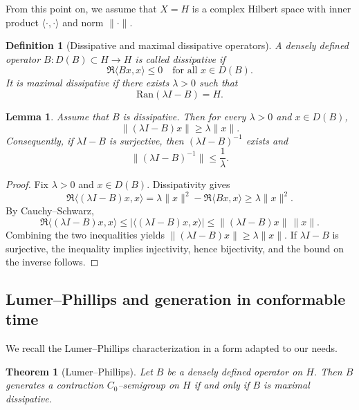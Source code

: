\documentclass[preprint,12pt]{elsarticle}
\newtheorem{theorem}{Theorem}
\newtheorem{lemma}{Lemma}
\newtheorem{definition}{Definition}
\newtheorem{proof}{Proof}
\begin{document}
From this point on, we assume that $X=H$ is a complex Hilbert space with inner product
$\langle\cdot,\cdot\rangle$ and norm $\|\cdot\|$.

\begin{definition}[Dissipative and maximal dissipative operators]\label{def:mdiss}
A densely defined operator $B:D(B)\subset H\to H$ is called \emph{dissipative} if
\[
\Re\langle Bx,x\rangle\le 0
\quad\text{for all }x\in D(B).
\]
It is \emph{maximal dissipative} if there exists $\lambda>0$ such that
\[
\mathrm{Ran}(\lambda I-B)=H.
\]
\end{definition}

\begin{lemma}\label{lem:resolvent_combined}
Assume that $B$ is dissipative.
Then for every $\lambda>0$ and $x\in D(B)$,
\[
\|(\lambda I-B)x\|\ge \lambda\|x\|.
\]
Consequently, if $\lambda I-B$ is surjective, then $(\lambda I-B)^{-1}$ exists and
\[
\|(\lambda I-B)^{-1}\|\le \frac1\lambda.
\]
\end{lemma}

\begin{proof}
Fix $\lambda>0$ and $x\in D(B)$.
Dissipativity gives
\[
\Re\langle (\lambda I-B)x,x\rangle
=
\lambda\|x\|^2-\Re\langle Bx,x\rangle
\ge \lambda\|x\|^2.
\]
By Cauchy--Schwarz,
\[
\Re\langle (\lambda I-B)x,x\rangle
\le |\langle (\lambda I-B)x,x\rangle|
\le \|(\lambda I-B)x\|\,\|x\|.
\]
Combining the two inequalities yields
$\|(\lambda I-B)x\|\ge \lambda\|x\|$.
If $\lambda I-B$ is surjective, the inequality implies injectivity, hence
bijectivity, and the bound on the inverse follows.
\end{proof}

\subsection*{Lumer--Phillips and generation in conformable time}

We recall the Lumer--Phillips characterization in a form adapted to our needs.

\begin{theorem}[Lumer--Phillips]\label{thm:lumer_phillips_combined}
Let $B$ be a densely defined operator on $H$.
Then $B$ generates a contraction $C_0$--semigroup on $H$ if and only if $B$ is
maximal dissipative.
\end{theorem}
\end{document}
